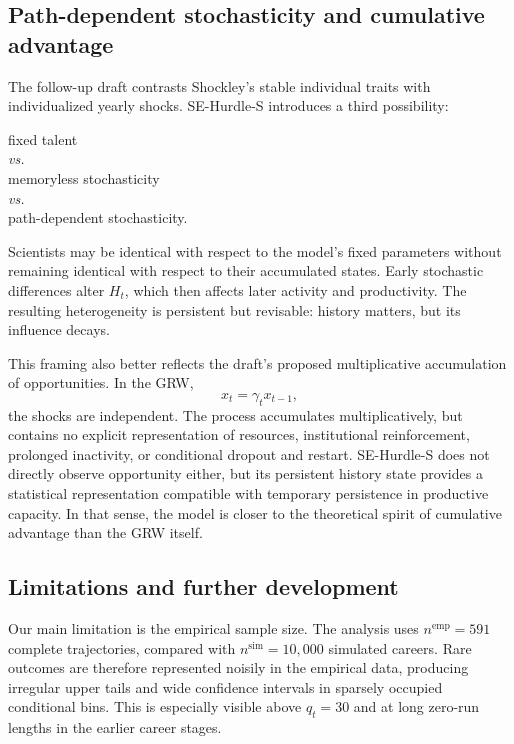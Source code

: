 \documentclass[twocolumn, letterpaper]{article}
\begin{document}
\subsection{Path-dependent stochasticity and cumulative advantage}
\label{disc:path_dependence}

The follow-up draft contrasts Shockley's stable individual traits with individualized yearly shocks. SE-Hurdle-S introduces a third possibility:
\begin{center}
    fixed talent\\
    \textit{vs.}\\
    memoryless stochasticity\\
    \textit{vs.}\\
    path-dependent stochasticity.
\end{center}

Scientists may be identical with respect to the model's fixed parameters without remaining identical with respect to their accumulated states. Early stochastic differences alter $H_t$, which then affects later activity and productivity. The resulting heterogeneity is persistent but revisable: history matters, but its influence decays.

This framing also better reflects the draft's proposed multiplicative accumulation of opportunities. In the GRW,
\[x_t=\gamma_t x_{t-1},\]
the shocks are independent. The process accumulates multiplicatively, but contains no explicit representation of resources, institutional reinforcement, prolonged inactivity, or conditional dropout and restart. SE-Hurdle-S does not directly observe opportunity either, but its persistent history state provides a statistical representation compatible with temporary persistence in productive capacity. In that sense, the model is closer to the theoretical spirit of cumulative advantage than the GRW itself.

\subsection{Limitations and further development}
\label{disc:lims}

Our main limitation is the empirical sample size. The analysis uses $n^{\mathrm{emp}}=591$ complete trajectories, compared with $n^{\mathrm{sim}}=10{,}000$ simulated careers. Rare outcomes are therefore represented noisily in the empirical data, producing irregular upper tails and wide confidence intervals in sparsely occupied conditional bins. This is especially visible above $q_t=30$ and at long zero-run lengths in the earlier career stages.
\end{document}
